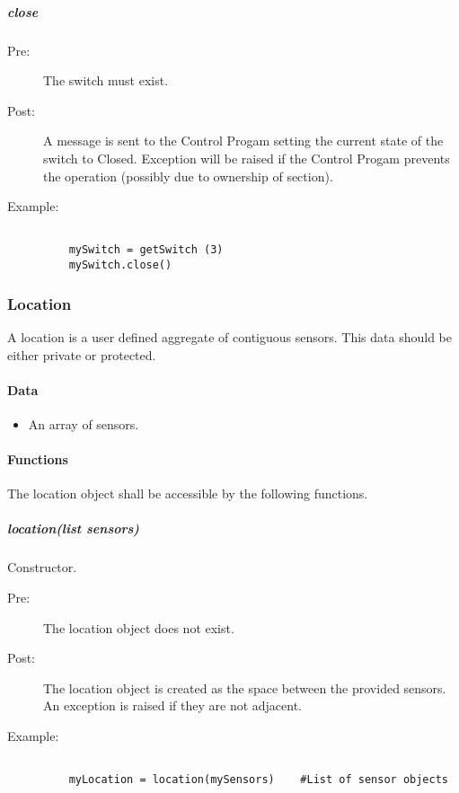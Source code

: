 \documentclass[a4paper,11pt,notitlepage]{article}
\def\CS{Control Progam\xspace}
\begin{document}
\subparagraph{close}
\begin{description}
\item[\hspace{1cm}Pre:] The switch must exist.
\item[\hspace{1cm}Post:] A message is sent to the \CS setting the current state of the switch to Closed. Exception will be raised if the \CS prevents the operation (possibly due to ownership of section).
\item[\hspace{1cm}Example:]
\begin{verbatim}

    mySwitch = getSwitch (3)
    mySwitch.close()
\end{verbatim}
\end{description}


\subsubsection{Location}
A location is a user defined aggregate of contiguous sensors. This data should be either private or protected.
\paragraph{Data}
\begin{itemize}
\item An array of sensors.
\end{itemize}
\paragraph{Functions}
The location object shall be accessible by the following functions.

\subparagraph{location(list sensors)} Constructor.
\begin{description}
\item[\hspace{1cm}Pre:] The location object does not exist.
\item[\hspace{1cm}Post:] The location object is created as the space between the provided sensors. An exception is raised if they are not adjacent.
\item[\hspace{1cm}Example:]
\begin{verbatim}

    myLocation = location(mySensors)    #List of sensor objects
\end{verbatim}
\end{description}
\end{document}
